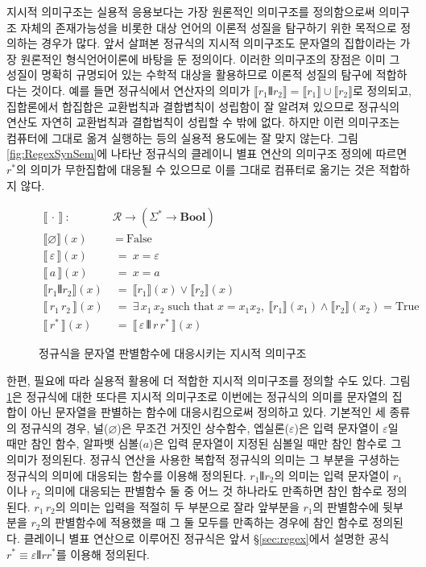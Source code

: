 지시적 의미구조는 실용적 응용보다는 가장 원론적인 의미구조를 정의함으로써
의미구조 자체의 존재가능성을 비롯한 대상 언어의 이론적 성질을 탐구하기 위한
목적으로 정의하는 경우가 많다. 앞서 살펴본 정규식의 지시적 의미구조도
문자열의 집합이라는 가장 원론적인 형식언어이론에 바탕을 둔 정의이다.
이러한 의미구조의 장점은 이미 그 성질이 명확히 규명되어 있는 수학적 대상을
활용하므로 이론적 성질의 탐구에 적합하다는 것이다. 예를 들면
정규식에서 \VERT 연산자의 의미가 $ \llbracket r_1\VERT r_2\rrbracket
= \llbracket r_1\rrbracket\cup\llbracket r_2\rrbracket$로 정의되고,
집합론에서 합집합은 교환법칙과 결합볍칙이 성립함이 잘 알려져 있으므로
정규식의 \VERT 연산도 자연히 교환법칙과 결합법칙이 성립할 수 밖에 없다.
하지만 이런 의미구조는 컴퓨터에 그대로 옮겨 실행하는 등의 실용적 용도에는
잘 맞지 않는다. 그림\;\ref{fig:RegexSynSem}에 나타난 정규식의
클레이니 별표 연산의 의미구조 정의에 따르면 $r^{*}$의 의미가 무한집합에
대응될 수 있으므로 이를 그대로 컴퓨터로 옮기는 것은 적합하지 않다.

\begin{figure}
\begin{align*}
\llbracket\,\cdot\,\rrbracket
 ~:~& \mathcal{R} \to (\Sigma^{*} \to \textbf{Bool})
\\
\llbracket \varnothing \rrbracket(x)   &~=~ \text{False} \\
\llbracket\,\varepsilon\,\rrbracket(x) &~=~ x=\varepsilon \\
\llbracket\,a\,\rrbracket(x)           &~=~ x=a \\
\llbracket r_1 \VERT r_2 \rrbracket(x) &~=~
 \llbracket r_1\rrbracket(x) \lor \llbracket r_2\rrbracket(x)\\
\llbracket\,r_1 \, r_2\,\rrbracket(x) &~=~
  \exists\,x_1\,x_2 \;\text{such that}\; x=x_1x_2,~
  \llbracket r_1\rrbracket(x_1) \land \llbracket r_2\rrbracket(x_2)
  = \text{True} \\
\llbracket\, r^{*} \,\rrbracket(x) &~=~
 \llbracket\,\varepsilon\,\VERT\,r\,r^{*}\,\rrbracket(x)
\end{align*}
\caption{정규식을 문자열 판별함수에 대응시키는
         지시적 의미구조\label{fig:RegexDenoSem}}
\end{figure}

한편, 필요에 따라 실용적 활용에 더 적합한 지시적 의미구조를
정의할 수도 있다. 그림\;\ref{fig:RegexDenoSem}은 정규식에 대한
또다른 지시적 의미구조로 이번에는 정규식의 의미를 문자열의 집합이
아닌 문자열을 판별하는 함수에 대응시킴으로써 정의하고 있다. 기본적인
세 종류의 정규식의 경우, 널($\varnothing$)은 무조건 거짓인 상수함수,
엡실론($\varepsilon$)은 입력 문자열이 $\varepsilon$일 때만 참인 함수,
알파뱃 심볼($a$)은 입력 문자열이 지정된 심볼일 때만 참인 함수로 그
의미가 정의된다. 정규식 연산을 사용한 복합적 정규식의 의미는
그 부분을 구셩하는 정규식의 의미에 대응되는 함수를 이용해 정의된다.
$r_1\VERT r_2$의 의미는 입력 문자열이 $r_1$이나 $r_2$ 의미에 대응되는
판별함수 둘 중 어느 것 하나라도 만족하면 참인 함수로 정의된다.
$r_1\,r_2$의 의미는 입력을 적절히 두 부분으로 잘라 앞부분을 $r_1$의
판별함수에 뒷부분을 $r_2$의 판별함수에 적용했을 때 그 둘 모두를
만족하는 경우에 참인 함수로 정의된다. 클레이니 별표 연산으로
이루어진 정규식은 앞서 \S\ref{sec:regex}에서 설명한 공식
$r^{*} \equiv \varepsilon\VERT rr^{*}$를 이용해 정의된다.


